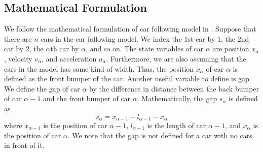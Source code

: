\documentclass[12pt]{article}
\begin{document}
    \subsection{Mathematical Formulation}\label{ch1}
        We follow the mathematical formulation of car following model in \cite{traffic}. Suppose that there are $n$ cars in the car following model. We index the $1$st car by $1$, the $2$nd car by $2$, the $\alpha$th car by $\alpha$, and so on. The state variables of car $\alpha$ are position $x_\alpha$, velocity $v_\alpha$, and acceleration $a_\alpha$. Furthermore, we are also assuming that the cars in the model has some kind of width. Thus, the position $x_\alpha$ of car $\alpha$ is defined as the front bumper of the car. Another useful variable to define is gap. We define the gap of car $\alpha$ by the difference in distance between the back bumper of car $\alpha - 1$ and the front bumper of car $\alpha$. Mathematically, the gap $s_\alpha$ is defined as 
        \begin{equation} 
          s_\alpha = x_{\alpha - 1} - l_{\alpha -1}  - x_{\alpha}
        \end{equation}
        where $x_{\alpha - 1}$ is the position of car $\alpha - 1$, $l_{\alpha - 1}$ is the length of car $\alpha - 1$, and $x_\alpha$ is the position of car $\alpha$. We note that the gap is not defined for a car with no cars in front of it. 
\end{document}
